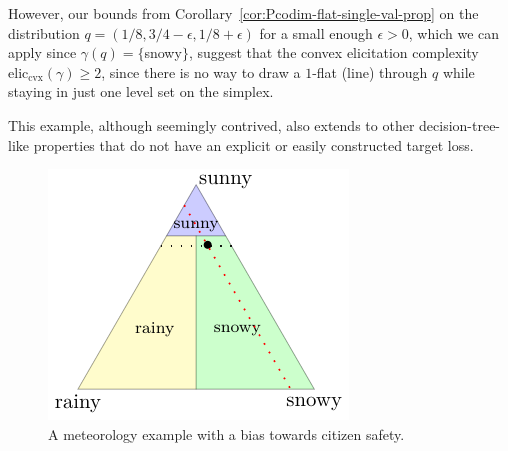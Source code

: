 \documentclass[anon,12pt]{colt2021} %
\newcommand{\eliccvx}{\mathrm{elic}_\mathrm{cvx}}
\begin{document}
However, our bounds from Corollary~\ref{cor:Pcodim-flat-single-val-prop} on the distribution $q = (1/8, 3/4 - \epsilon, 1/8 + \epsilon)$ for a small enough $\epsilon > 0$, which we can apply since $\gamma(q) = \{$snowy$\}$, suggest that the convex elicitation complexity $\eliccvx(\gamma) \geq 2$, since there is no way to draw a $1$-flat (line) through $q$ while staying in just one level set on the simplex.


This example, although seemingly contrived, also extends to other decision-tree-like properties that do not have an explicit or easily constructed target loss.
\begin{figure}
	\centering
	\includegraphics[width=0.5\linewidth]{tikz/t-example.pdf}
	\caption{A meteorology example with a bias towards citizen safety.}
	\label{fig:t-example}
\end{figure}
\end{document}
